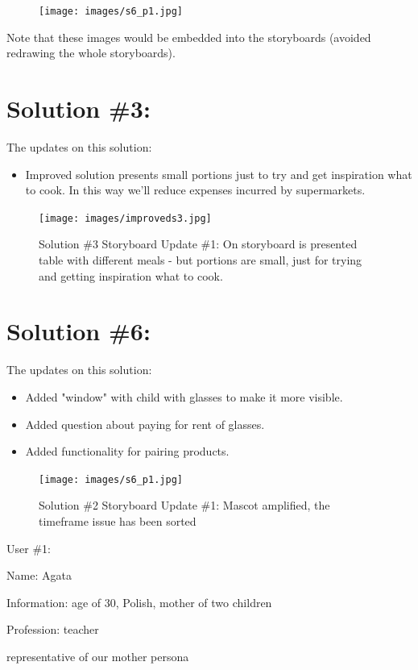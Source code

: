 \documentclass[a4paper,10pt,oneside]{scrreprt}
\begin{document}
\begin{figure}[H]
	\centering
	\texttt{[image: images/s6\_p1.jpg]}
\end{figure}
\bigskip
\bigskip
Note that these images would be embedded into the storyboards (avoided redrawing the whole storyboards).

\section{Solution \#3:}
The updates on this solution:
\begin{itemize}
	\item Improved solution presents small portions just to try and get inspiration what to cook. In this way we'll reduce expenses incurred by supermarkets.

\end{itemize}

\begin{figure}[H]
	\centering
	\texttt{[image: images/improveds3.jpg]}
	\caption{Solution \#3 Storyboard Update \#1: \newline On storyboard is presented table with different meals - but portions are small, just for trying and getting inspiration what to cook.}
\end{figure}
\bigskip
\clearpage

\section{Solution \#6:}
The updates on this solution:
\begin{itemize}
	\item Added "window" with child with glasses to make it more visible.
	\item Added question about paying for rent of glasses.
	\item Added functionality for pairing products.

\end{itemize}

\begin{figure}[H]
	\centering
	\texttt{[image: images/s6\_p1.jpg]}
	\caption{Solution \#2 Storyboard Update \#1: \newline Mascot amplified, the timeframe issue has been sorted}
\end{figure}

User \#1:
\begin{compactitem}
	\item Name: Agata
	\item Information: age of 30, Polish, mother of two children
	\item Profession: teacher
	\item representative of our mother persona
\end{compactitem}
\bigskip
\end{document}
